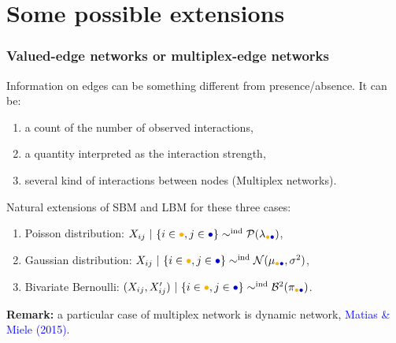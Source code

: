 \documentclass[nopagenumber,9pt]{beamer}
\begin{document}
\section{Some possible extensions}


\begin{frame}
 \frametitle{Valued-edge networks or multiplex-edge networks}
 
 Information on edges can be something different from presence/absence.
 It can be:
 \begin{enumerate}
  \item a count of the number of observed interactions,
  \item a quantity interpreted as the interaction strength,
  \item several kind of interactions between nodes (Multiplex networks).
 \end{enumerate}

 \bigskip
 
 
Natural extensions of SBM and LBM for these three cases:
 \begin{enumerate}
  \item Poisson distribution: $X_{ij} \ | \ \{i\in\textcolor{yellow!40!orange}{\bullet},j\in\textcolor{blue!80!black}{\bullet}\}
\sim^{\text{ind}} \mathcal{P}(\lambda_{\textcolor{yellow!40!orange}{\bullet}\textcolor{blue!80!black}{\bullet}})$,
 \item Gaussian distribution: $X_{ij} \ | \ \{i\in\textcolor{yellow!40!orange}{\bullet},j\in\textcolor{blue!80!black}{\bullet}\}
\sim^{\text{ind}} \mathcal{N}(\mu_{\textcolor{yellow!40!orange}{\bullet}\textcolor{blue!80!black}{\bullet}},\sigma^2)$,
\item Bivariate Bernoulli: $(X_{ij},X'_{ij} )\ | \ \{i\in\textcolor{yellow!40!orange}{\bullet},j\in\textcolor{blue!80!black}{\bullet}\}
\sim^{\text{ind}} \mathcal{B}^ 2(\pi_{\textcolor{yellow!40!orange}{\bullet}\textcolor{blue!80!black}{\bullet}})$. 
 \end{enumerate}

 \bigskip
\textbf{Remark:} a particular case of multiplex network is dynamic network, \textcolor{blue}{Matias \& Miele (2015)}.
 
\end{frame}
\end{document}
